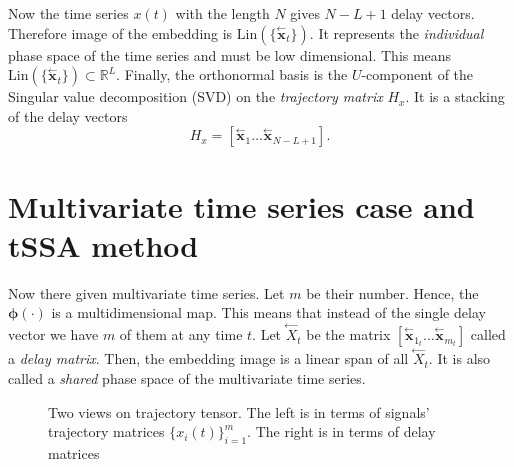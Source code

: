 \documentclass[referee, pdflatex, sn-mathphys-num]{sn-jnl}
\theoremstyle{definition}
\theoremstyle{plain}
\newcommand{\delayV}[1]{\overset{\leftarrow}{\mathbf{x}}_{#1}}
\newcommand{\delayM}[1]{\overset{\leftarrow}{X}_{#1}}
\begin{document}
	Now the time series $ x(t) $ with the length $ N $ gives $ N - L + 1 $ delay vectors. Therefore image of the embedding is $ \text{Lin}(\{\delayV{t}\}) $. It represents the \emph{individual} phase space of the time series and must be low dimensional. This means $ \text{Lin}(\{\delayV{t}\}) \subset \mathbb{R}^L $. Finally, the orthonormal basis is the $ U $-component of the Singular value decomposition (SVD) on the \emph{trajectory matrix} $ H_x $. It is a stacking of the delay vectors	\[
		H_x = [ \delayV{1} \ldots  \delayV{N - L + 1}].
	\]
	
	\section{Multivariate time series case and tSSA method}\label{sec:tssa_method}
	
	Now there given multivariate time series. Let $ m $ be their number. Hence, the $ \boldsymbol{\phi}(\cdot) $ is a multidimensional map. This means that instead of the single delay vector we have $ m $ of them at any time $ t $. Let $ \delayM{t} $ be the matrix $ [ \delayV{1_t} \ldots \delayV{m_t} ] $ called a \emph{delay matrix}. Then, the embedding image is a linear span of all $ \delayM{t} $. It is also called a \emph{shared} phase space of the multivariate time series.
	
	\begin{figure}[!htbp]
		\centering
		
		\caption{Two views on trajectory tensor. The left is in terms of signals' trajectory matrices $ \{x_i(t)\}_{i=1}^m $. The right is in terms of delay matrices}\label{pic:traj_tensor}
	\end{figure}
	
\end{document}
